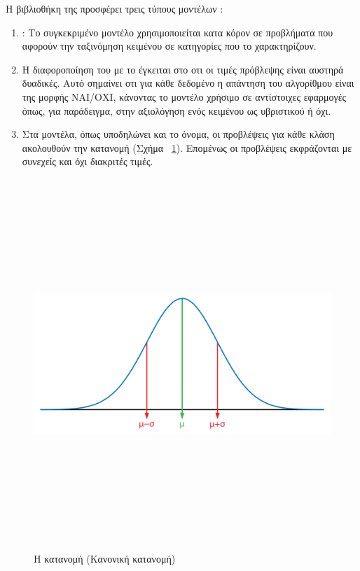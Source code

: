 Η βιβλιοθήκη  της  προσφέρει τρεις τύπους μοντέλων  :
\begin{enumerate}
    \item {}: Το συγκεκριμένο μοντέλο χρησιμοποιείται κατα κόρον σε προβλήματα που αφορούν την ταξινόμηση κειμένου σε κατηγορίες που το χαρακτηρίζουν.
    \item {} Η διαφοροποίηση του με το  έγκειται στο οτι οι τιμές πρόβλεψης είναι αυστηρά δυαδικές. Αυτό σημαίνει οτι για κάθε δεδομένο η απάντηση του αλγορίθμου είναι της μορφής ΝΑΙ/ΟΧΙ, κάνοντας το μοντέλο χρήσιμο σε αντίστοιχες εφαρμογές όπως, για παράδειγμα, στην αξιολόγηση ενός κειμένου ως υβριστικού ή όχι.
    \item {} Στα  μοντέλα, όπως υποδηλώνει και το όνομα, οι προβλέψεις για κάθε κλάση ακολουθούν την κατανομή  (Σχήμα ~\ref{figure2.1}). Επομένως οι προβλέψεις εκφράζονται με συνεχείς και όχι διακριτές τιμές. 
\end{enumerate}

\begin{figure}\centering
\includegraphics[width=\textwidth,height=14cm,keepaspectratio]{pictures/2.1Gaussian_distribution.png} \caption{Η κατανομή  (Κανονική κατανομή)}\label{figure2.1}
\end{figure}

